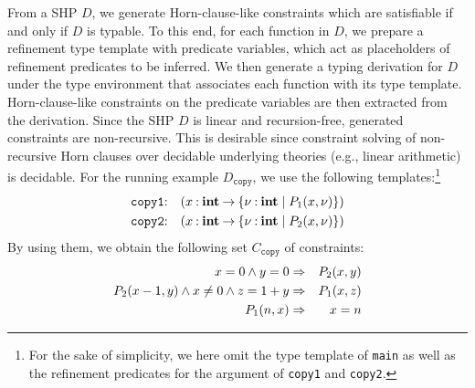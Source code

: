 From a SHP \(D\), we generate Horn-clause-like constraints which are 
satisfiable if and only if \(D\) is typable.  To this end, for each 
function in \(D\), we prepare a refinement type template with predicate 
variables, which act as placeholders of refinement predicates to be 
inferred.  We then generate a typing derivation for \(D\) under the type 
environment that associates each function with its type template.  
Horn-clause-like constraints on the predicate variables are then 
extracted from the derivation.  Since the SHP \(D\) is linear and 
recursion-free, generated constraints are non-recursive.  This is 
desirable since constraint solving of non-recursive Horn clauses over 
decidable underlying theories (e.g., linear arithmetic) is decidable.  
For the running example \(D_{\texttt{copy}}\), we use the following 
templates:\footnote{For the sake of simplicity, we here omit the type 
template of \texttt{main} as well as the refinement predicates for the 
argument of \texttt{copy1} and \texttt{copy2}.}
\begin{eqnarray*}
\texttt{copy1}&\mathbin{:}&(x\mathbin{:}{\mathbf{int}}\mathbin{\rightarrow}{\{{\nu\mathbin{:}\mathbf{int} \mid P_1(x,\nu)}\}}) \\
\texttt{copy2}&\mathbin{:}&(x\mathbin{:}{\mathbf{int}}\mathbin{\rightarrow}{\{{\nu\mathbin{:}\mathbf{int} \mid P_2(x,\nu)}\}})
\end{eqnarray*}
By using them, we obtain the following set \(C_{\texttt{copy}}\) of
constraints:
\begin{eqnarray*}
x=0 \land y=0 &\Rightarrow& P_2(x,y) \\
P_2(x-1,y) \land x\neq0 \land z=1+y &\Rightarrow& P_1(x,z) \\
P_1(n,x) &\Rightarrow& x=n
\end{eqnarray*}


